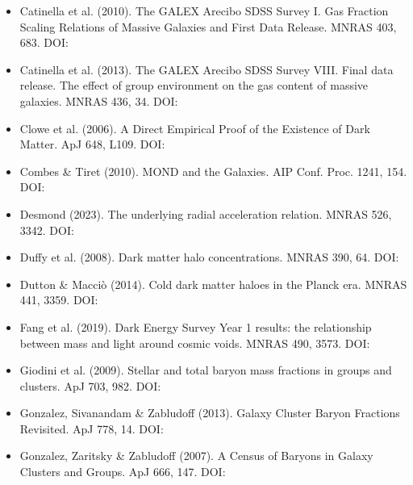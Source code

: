 \documentclass[11pt,a4paper]{article}
\begin{document}
\begin{itemize}
  \item Catinella et al. (2010). The GALEX Arecibo SDSS Survey I. Gas Fraction Scaling Relations of Massive Galaxies and First Data Release. MNRAS 403, 683. DOI: \href{https://doi.org/10.1111/j.1365-2966.2009.16180.x}{{\small\protect{}}}
  \item Catinella et al. (2013). The GALEX Arecibo SDSS Survey VIII. Final data release. The effect of group environment on the gas content of massive galaxies. MNRAS 436, 34. DOI: \href{https://doi.org/10.1093/mnras/stt1417}{{\small\protect{}}}
  \item Clowe et al. (2006). A Direct Empirical Proof of the Existence of Dark Matter. ApJ 648, L109. DOI: \href{https://doi.org/10.1086/508162}{{\small\protect{}}}
  \item Combes \& Tiret (2010). MOND and the Galaxies. AIP Conf. Proc. 1241, 154. DOI: \href{https://doi.org/10.1063/1.3462629}{{\small\protect{}}}
  \item Desmond (2023). The underlying radial acceleration relation. MNRAS 526, 3342. DOI: \href{https://doi.org/10.1093/mnras/stad2762}{{\small\protect{}}}
  \item Duffy et al. (2008). Dark matter halo concentrations. MNRAS 390, 64. DOI: \href{https://doi.org/10.1111/j.1745-3933.2008.00537.x}{{\small\protect{}}}
  \item Dutton \& Macci\`o (2014). Cold dark matter haloes in the Planck era. MNRAS 441, 3359. DOI: \href{https://doi.org/10.1093/mnras/stu742}{{\small\protect{}}}
  \item Fang et al. (2019). Dark Energy Survey Year 1 results: the relationship between mass and light around cosmic voids. MNRAS 490, 3573. DOI: \href{https://doi.org/10.1093/mnras/stz2805}{{\small\protect{}}}
  \item Giodini et al. (2009). Stellar and total baryon mass fractions in groups and clusters. ApJ 703, 982. DOI: \href{https://doi.org/10.1088/0004-637X/703/1/982}{{\small\protect{}}}
  \item Gonzalez, Sivanandam \& Zabludoff (2013). Galaxy Cluster Baryon Fractions Revisited. ApJ 778, 14. DOI: \href{https://doi.org/10.1088/0004-637X/778/1/14}{{\small\protect{}}}
  \item Gonzalez, Zaritsky \& Zabludoff (2007). A Census of Baryons in Galaxy Clusters and Groups. ApJ 666, 147. DOI: \href{https://doi.org/10.1086/519729}{{\small\protect{}}}

\end{itemize}
\end{document}
